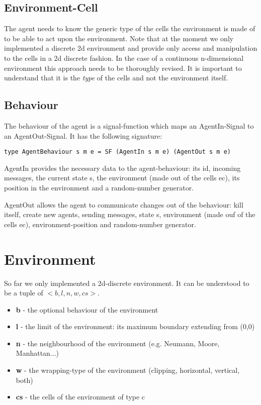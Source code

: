 \subsection{Environment-Cell}
The agent needs to know the generic type of the cells the environment is made of to be able to act upon the environment. Note that at the moment we only implemented a discrete 2d environment and provide only access and manipulation to the cells in a 2d discrete fashion. In the case of a continuous n-dimensional environment this approach needs to be thoroughly revised. It is important to understand that it is the \textit{type} of the cells and not the environment itself.

\subsection{Behaviour}
The behaviour of the agent is a signal-function which maps an AgentIn-Signal to an AgentOut-Signal. It has the following signature: 
\begin{lstlisting}[]
type AgentBehaviour s m e = SF (AgentIn s m e) (AgentOut s m e)
\end{lstlisting}

AgentIn provides the necessary data to the agent-behaviour: its id, incoming messages, the current state s, the environment (made out of the cells ec), its position in the environment and a random-number generator. 

AgentOut allows the agent to communicate changes out of the behaviour: kill itself, create new agents, sending messages, state s, environment (made ouf of the cells ec), environment-position and random-number generator. 

\section{Environment}
So far we only implemented a 2d-discrete environment. It can be understood to be a tuple of $<b, l, n, w, cs>$.
\begin{itemize}
	\item \textbf{b} - the optional behaviour of the environment
	\item \textbf{l} - the limit of the environment: its maximum boundary extending from (0,0)
	\item \textbf{n} - the neighbourhood of the environment (e.g. Neumann, Moore, Manhattan...)
	\item \textbf{w} - the wrapping-type of the environment (clipping, horizontal, vertical, both)
	\item \textbf{cs} - the cells of the environment of type c
\end{itemize}

